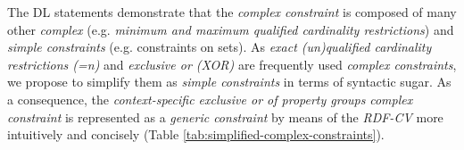 \documentclass[a4paper,fontsize=11pt]{scrartcl}
\begin{document}

The DL statements demonstrate that the \emph{complex constraint} 
is composed of many other \emph{complex} (e.g. \emph{minimum and maximum qualified cardinality restrictions}) and \emph{simple constraints} (e.g. constraints on sets).
As \emph{exact (un)qualified cardinality restrictions (=n)} and \emph{exclusive or (XOR)} are frequently used \emph{complex constraints},
we propose to simplify them as \emph{simple constraints} in terms of syntactic sugar.
As a consequence, the \emph{context-specific exclusive or of property groups} \emph{complex constraint} is represented as a \emph{generic constraint} by means of the \emph{RDF-CV} more intuitively and concisely (Table \ref{tab:simplified-complex-constraints}).
\end{document}
